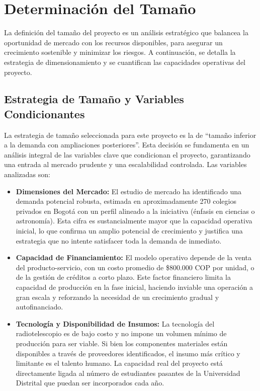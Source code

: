 \section*{Determinación del Tamaño}

La definición del tamaño del proyecto es un análisis estratégico que balancea la oportunidad de mercado con los recursos disponibles, para asegurar un crecimiento sostenible y minimizar los riesgos. A continuación, se detalla la estrategia de dimensionamiento y se cuantifican las capacidades operativas del proyecto.

\subsection*{Estrategia de Tamaño y Variables Condicionantes}

La estrategia de tamaño seleccionada para este proyecto es la de ``tamaño inferior a la demanda con ampliaciones posteriores''. Esta decisión se fundamenta en un análisis integral de las variables clave que condicionan el proyecto, garantizando una entrada al mercado prudente y una escalabilidad controlada. Las variables analizadas son:

\begin{itemize}
    \item \textbf{Dimensiones del Mercado:} El estudio de mercado ha identificado una demanda potencial robusta, estimada en aproximadamente 270 colegios privados en Bogotá con un perfil alineado a la iniciativa (énfasis en ciencias o astronomía). Esta cifra es sustancialmente mayor que la capacidad operativa inicial, lo que confirma un amplio potencial de crecimiento y justifica una estrategia que no intente satisfacer toda la demanda de inmediato.

    \item \textbf{Capacidad de Financiamiento:} El modelo operativo depende de la venta del producto-servicio, con un costo promedio de \$800.000 COP por unidad, o de la gestión de créditos a corto plazo. Este factor financiero limita la capacidad de producción en la fase inicial, haciendo inviable una operación a gran escala y reforzando la necesidad de un crecimiento gradual y autofinanciado.

    \item \textbf{Tecnología y Disponibilidad de Insumos:} La tecnología del radiotelescopio es de bajo costo y no impone un volumen mínimo de producción para ser viable. Si bien los componentes materiales están disponibles a través de proveedores identificados, el insumo más crítico y limitante es el talento humano. La capacidad real del proyecto está directamente ligada al número de estudiantes pasantes de la Universidad Distrital que puedan ser incorporados cada año.
\end{itemize}

